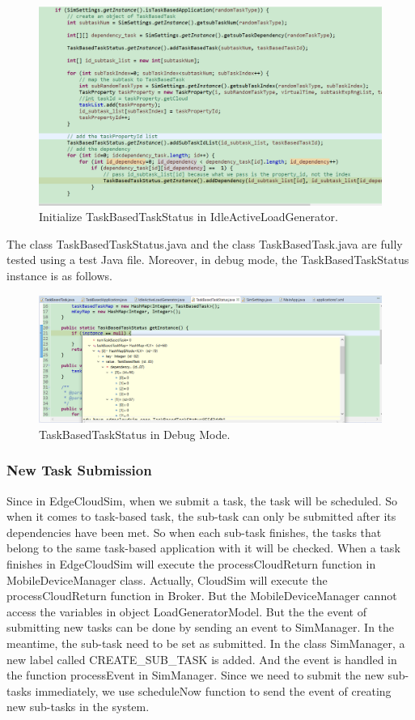 \begin{figure}
	\centering
	\includegraphics[width=1\textwidth]{./figures/IdleActiveLoadGenerator-TaskBasedTask.png}
	\caption{\label{fig:frog}Initialize TaskBasedTaskStatus in IdleActiveLoadGenerator.}
\end{figure}

The class TaskBasedTaskStatus.java and the class TaskBasedTask.java are fully tested using a test Java file. Moreover, in debug mode, the TaskBasedTaskStatus instance is as follows.

\begin{figure}
	\centering
	\includegraphics[width=1\textwidth]{./figures/TaskBasedTaskStatus-1.png}
	\caption{\label{fig:frog}TaskBasedTaskStatus in Debug Mode.}
\end{figure}

\subsubsection{New Task Submission}
Since in EdgeCloudSim, when we submit a task, the task will be scheduled. So when it comes to task-based task, the  sub-task can only be submitted after its dependencies  have been met. So when each sub-task finishes, the tasks that belong to the same task-based application with it will be checked. When a task finishes in EdgeCloudSim will execute the processCloudReturn function in MobileDeviceManager class. Actually, CloudSim will execute the processCloudReturn function in Broker. But the MobileDeviceManager cannot access the variables in object LoadGeneratorModel. But the the event of submitting new tasks can be done by sending  an event to SimManager. In the  meantime, the sub-task need to be set as submitted. In the class SimManager, a new label called CREATE\_SUB\_TASK is added. And the event is handled in the function processEvent in SimManager. Since we need to submit the new sub-tasks immediately, we use scheduleNow function to send the event of creating new sub-tasks in the system.

